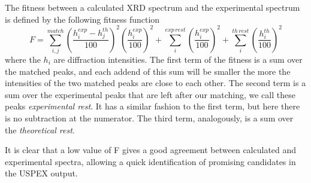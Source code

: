 \documentclass{article}
\begin{document}
The fitness between a calculated XRD spectrum and the experimental spectrum is defined by the following fitness function
\begin{equation*}
	F = \sum_{i, j}^{match} \left( \frac{h_i^{exp} - h_j^{th}}{100} \right)^2 \left( \frac{h_i^{exp}}{100} \right)^2 + \sum_i^{exp \, rest} \left( \frac{h_i^{exp}}{100} \right)^2 + \sum_i^{th \, rest} \left( \frac{h_i^{th}}{100} \right)^2
\end{equation*}
where the $h_i$ are diffraction intensities. The first term of the fitness is a sum over the matched peaks, and each addend of this sum will be smaller the more the intensities of the two matched peaks are close to each other. The second term is a sum over the experimental peaks that are left after our matching, we call these peaks \emph{experimental rest}. It has a similar fashion to the first term, but here there is no subtraction at the numerator. The third term, analogously, is a sum over the \emph{theoretical rest}.

It is clear that a low value of F gives a good agreement between calculated and experimental spectra, allowing a quick identification of promising candidates in the USPEX output.
\end{document}
